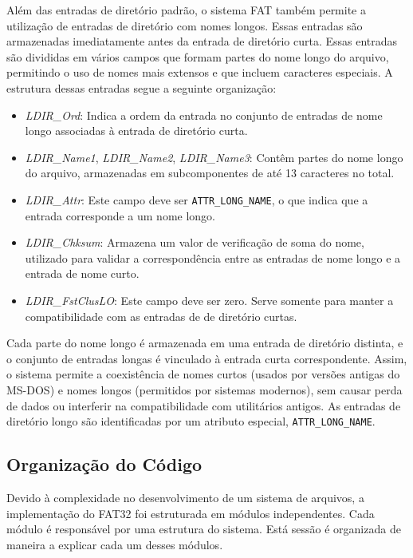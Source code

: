 \documentclass[
    12pt,				%
    oneside,   	        %
    a4paper,			%
    english,			%
    french,				%
    spanish,			%
    brazil,				%
    ]{pacotes/abntex2}
\begin{document}
Além das entradas de diretório padrão, o sistema FAT também permite a utilização de entradas de diretório com nomes longos. Essas entradas são armazenadas imediatamente antes da entrada de diretório curta. Essas entradas são divididas em vários campos que formam partes do nome longo do arquivo, permitindo o uso de nomes mais extensos e que incluem caracteres especiais. A estrutura dessas entradas segue a seguinte organização:

\begin{itemize} 
    \item \textit{LDIR\_Ord}: Indica a ordem da entrada no conjunto de entradas de nome longo associadas à entrada de diretório curta.
    \item \textit{LDIR\_Name1}, \textit{LDIR\_Name2}, \textit{LDIR\_Name3}: Contêm partes do nome longo do arquivo, armazenadas em subcomponentes de até 13 caracteres no total. 
    \item \textit{LDIR\_Attr}: Este campo deve ser \texttt{ATTR\_LONG\_NAME}, o que indica que a entrada corresponde a um nome longo.
    \item \textit{LDIR\_Chksum}: Armazena um valor de verificação de soma do nome, utilizado para validar a correspondência entre as entradas de nome longo e a entrada de nome curto. 
    \item \textit{LDIR\_FstClusLO}: Este campo deve ser zero. Serve somente para manter a compatibilidade com as entradas de de diretório curtas. 
\end{itemize}

Cada parte do nome longo é armazenada em uma entrada de diretório distinta, e o conjunto de entradas longas é vinculado à entrada curta correspondente. Assim, o sistema permite a coexistência de nomes curtos (usados por versões antigas do MS-DOS) e nomes longos (permitidos por sistemas modernos), sem causar perda de dados ou interferir na compatibilidade com utilitários antigos. As entradas de diretório longo são identificadas por um atributo especial, \texttt{ATTR\_LONG\_NAME}.

\subsection{Organização do Código}
\label{subsubsec:code}

Devido à complexidade no desenvolvimento de um sistema de arquivos, a implementação do FAT32 foi estruturada em módulos independentes. Cada módulo é responsável por uma estrutura do sistema. Está sessão é organizada de maneira a explicar cada um desses módulos.
\end{document}
